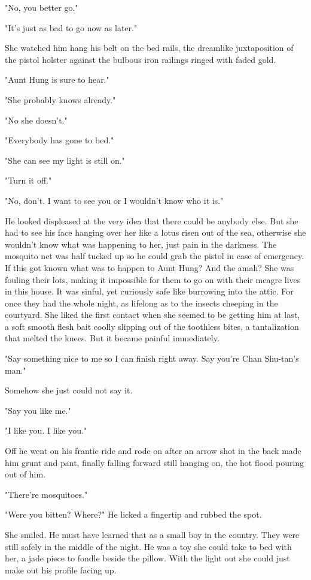 \par "No, you better go."
\par "It's just as bad to go now as later."
\par She watched him hang his belt on the bed rails, the dreamlike juxtaposition of the pistol holster against the bulbous iron railings ringed with faded gold.
\par "Aunt Hung is sure to hear."
\par "She probably knows already."
\par "No she doesn't."
\par "Everybody has gone to bed."
\par "She can see my light is still on."
\par "Turn it off."
\par "No, don't. I want to see you or I wouldn't know who it is."
\par He looked displeased at the very idea that there could be anybody else. But she had to see his face hanging over her like a lotus risen out of the sea, otherwise she wouldn't know what was happening to her, just pain in the darkness. The mosquito net was half tucked up so he could grab the pistol in case of emergency. If this got known what was to happen to Aunt Hung? And the amah? She was fouling their lots, making it impossible for them to go on with their meagre lives in this house. It was sinful, yet curiously safe like burrowing into the attic. For once they had the whole night, as lifelong as to the insects cheeping  in the courtyard. She liked the first contact when she seemed to be getting him at last, a soft smooth flesh bait coolly slipping  out of the toothless bites, a tantalization that melted the knees. But it became painful immediately.
\par "Say something nice to me so I can finish right away. Say you're Chan Shu-tan's man."
\par Somehow she just could not say it.
\par "Say you like me."
\par "I like you. I like you."
\par Off he went on his frantic ride and rode on after an arrow shot in the back made him grunt and pant, finally falling forward still hanging on, the hot flood pouring out of him.
\par "There're mosquitoes."
\par "Were you bitten? Where?" He licked a fingertip and rubbed the spot.
\par She smiled. He must have learned that as a small boy in the country. They were still safely in the middle of the night. He was a toy she could take to bed with her, a jade piece to fondle beside the pillow. With the light out she could just make out his profile facing up.
